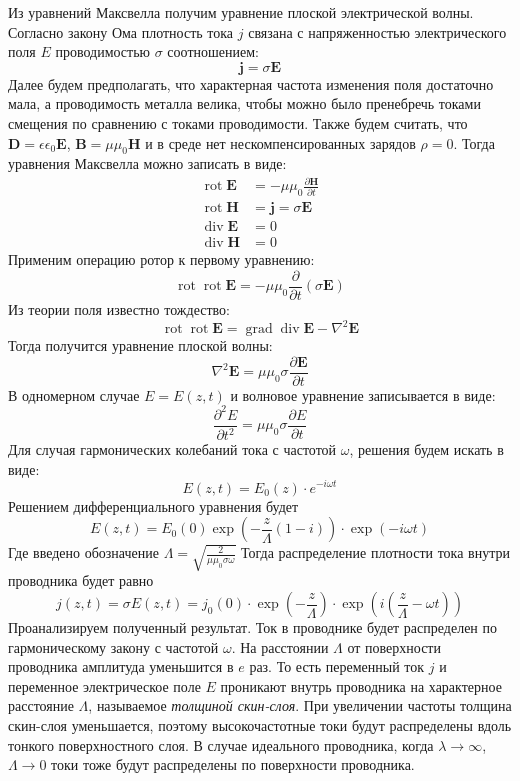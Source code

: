 Из уравнений Максвелла получим уравнение плоской электрической волны. Согласно закону Ома плотность тока $j$ связана с напряженностью электрического поля $E$ проводимостью $\sigma$ соотношением:
$$
\pmb{j} = \sigma \pmb {E}
$$
Далее будем предполагать, что характерная частота изменения поля достаточно мала, а проводимость металла велика, чтобы можно было пренебречь токами смещения по сравнению с токами проводимости. Также будем считать, что $\pmb{D} = \epsilon \epsilon_0 \pmb{E}$, $\pmb{B} = \mu \mu_0 \pmb{H}$ и в среде нет нескомпенсированных зарядов $\rho = 0$. Тогда уравнения Максвелла можно записать в виде:
\begin{equation*}
	\begin{split}
		\operatorname{rot} \pmb{E} &= -\mu \mu_0 \frac{\partial \pmb{H}}{\partial t} \\
		\operatorname{rot} \pmb{H} &= \pmb{j} = \sigma \pmb{E} \\
		\operatorname{div} \pmb{E} &= 0 \\
		\operatorname{div} \pmb{H} &= 0
	\end{split}
\end{equation*}
Применим операцию ротор к первому уравнению:
$$
\operatorname{rot} \operatorname{rot} \pmb{E} = - \mu \mu_0  \frac{\partial}{\partial t} \left( \sigma \pmb{E} \right)
$$
Из теории поля известно тождество:
$$
\operatorname{rot} \operatorname{rot} \pmb{E} = \operatorname{grad} \operatorname{div} \pmb{E} - \nabla^2 \pmb{E}
$$
Тогда получится уравнение плоской волны:
$$
\nabla^2 \pmb{E} = \mu \mu_0 \sigma \frac{\partial \pmb{E}}{\partial t}
$$
В одномерном случае $E = E(z, t)$ и волновое уравнение записывается в виде:
$$
\frac{\partial^2 E}{\partial t^2} = \mu \mu_0 \sigma \frac{\partial E}{\partial t}
$$
Для случая гармонических колебаний тока с частотой $\omega$, решения будем искать в виде:
$$
E(z, t) = E_0(z) \cdot e^{-i \omega t}
$$
Решением дифференциального уравнения будет
$$
E(z, t) = E_0(0) \exp{ \left( -\frac{z}{\Lambda} (1 - i) \right) }  \cdot \exp{ \left( -i \omega t \right) }
$$
Где введено обозначение $\Lambda = \sqrt{\frac{2}{\mu \mu_0 \sigma \omega}}$
Тогда распределение плотности тока внутри проводника будет равно
$$
j(z, t) = \sigma E(z, t) = j_0(0) \cdot \exp{ \left( -\frac{z}{\Lambda} \right)} \cdot \exp { \left( i \left(\frac{z}{ \Lambda} - \omega t \right) \right) }
$$
Проанализируем полученный результат. Ток в проводнике будет распределен по гармоническому закону с частотой $\omega$. На расстоянии $\Lambda$ от поверхности проводника амплитуда уменьшится в $e$ раз. То есть переменный ток $j$ и переменное электрическое поле $E$ проникают внутрь проводника на характерное расстояние $\Lambda$, называемое \textit{толщиной скин-слоя}. При увеличении частоты толщина скин-слоя уменьшается, поэтому высокочастотные токи будут распределены вдоль тонкого поверхностного слоя. В случае идеального проводника, когда $\lambda \rightarrow \infty$, $\Lambda \rightarrow 0$ токи тоже будут распределены по поверхности проводника.

